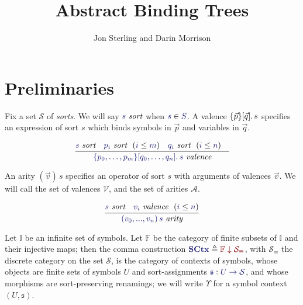 \documentclass[11pt]{article}
\theoremstyle{definition}
\theoremstyle{remark}
\numberwithin{equation}{section}
\def\IModeColorName{MidnightBlue}
\def\OModeColorName{Maroon}
\newcommand\IMode[1]{{\color{\IModeColorName}{#1}}}
\newcommand\OMode[1]{{\color{\OModeColorName}{#1}}}
\newcommand\HypJ[2]{#1\ \ (#2)}
\newcommand\Member[2]{\IMode{#1}\in\IMode{#2}}
\newcommand\Of[2]{\IMode{#1} : \IMode{#2}}
\newcommand\MkValence[3]{%
  \ifthenelse{\equal{#1}{}}{}{%
    \{#1\}%
  }%
  \ifthenelse{\equal{#2}{}}{}{%
    [#2]%
  }.\, #3
}
\newcommand\MkArity[2]{(#1)\, #2}
\newcommand\IsArity[1]{\IMode{#1}\ \textit{arity}}
\newcommand\IsValence[1]{\IMode{#1}\ \textit{valence}}
\newcommand\IsSort[1]{\IMode{#1}\ \textit{sort}}
\newcommand\Leq[2]{\IMode{#1}\leq\IMode{#2}}
\newcommand\Symbols{\mathbb{I}}
\newcommand\Finsets{\mathbb{F}}
\newcommand\Sorts{\mathcal{S}}
\newcommand\Valences{\mathcal{V}}
\newcommand\Arities{\mathcal{A}}
\newcommand\Discrete[1]{#1_{\equiv}}
\newcommand\SCtx{\mathbf{SCtx}}
\newcommand\Comma[2]{#1 \downarrow #2}
\newcommand\Define[2]{\IMode{#1}\triangleq\OMode{#2}}
\begin{document}
\title{Abstract Binding Trees}
\date{}
\author{Jon Sterling and Darin Morrison}
\maketitle

\section{Preliminaries}

Fix a set $\Sorts$ of \emph{sorts}. We will say $\IsSort{s}$ when
$\Member{s}{S}$. A valence $\MkValence{\vec{p}}{\vec{q}}{s}$ specifies an
expression of sort $s$ which binds symbols in $\vec{p}$ and variables in
$\vec{q}$.

\[
  \infer{
    \IsValence{\MkValence{p_0,\dots,p_m}{q_0,\dots,q_n}{s}}
  }{
    \IsSort{s} &
    \HypJ{\IsSort{p_i}}{\Leq{i}{m}} &
    \HypJ{\IsSort{q_i}}{\Leq{i}{n}} &
  }
\]

An arity $\MkArity{\vec{v}}{s}$ specifies an operator of sort $s$ with
arguments of valences $\vec{v}$. We will call the set of valences $\Valences$,
and the set of arities $\Arities$.

\[
  \infer{
    \IsArity{\MkArity{v_0,...,v_n}{s}}
  }{
    \IsSort{s} &
    \HypJ{\IsValence{v_i}}{\Leq{i}{n}}
  }
\]


Let $\Symbols$ be an infinite set of symbols. Let $\Finsets$ be the category of
finite subsets of $\Symbols$ and their injective maps; then the comma
construction $\Define{\SCtx}{\Comma{\Finsets}{\Discrete{\Sorts}}}$, with
$\Discrete{\Sorts}$ the discrete category on the set $\mathcal{S}$, is the
category of contexts of symbols, whose objects are finite sets of symbols $U$
and sort-assignments $\Of{\mathfrak{s}}{U\to\Sorts}$, and whose morphisms are
sort-preserving renamings; we will write $\Upsilon$ for a symbol context
$(U,\mathfrak{s})$.
\end{document}
